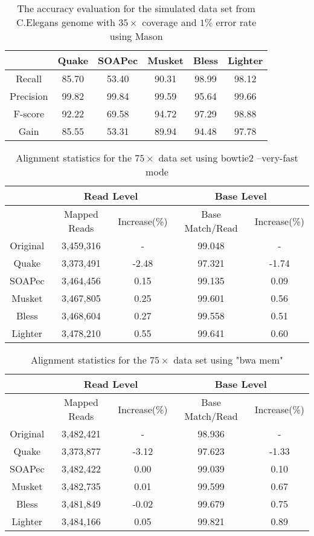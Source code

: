 \documentclass[10pt]{article}
\begin{document}
\begin{table}[h!]
\caption{The accuracy evaluation for the simulated data set from C.Elegans genome with $35\times$ coverage and $1\%$ error rate using Mason}
\begin{tabular}{|c|c|c|c|c|c|} \hline
	&Quake	&SOAPec	&Musket	&Bless	&Lighter \\ \hline
Recall	&85.70	&53.40	&90.31	&98.99	&98.12 \\ \hline
Precision	&99.82	&99.84	&99.59	&95.64	&99.66 \\ \hline
F-score	&92.22	&69.58	&94.72	&97.29	&98.88 \\ \hline
Gain	&85.55	&53.31	&89.94	&94.48	&97.78 \\ \hline
\end{tabular}
\end{table}


\begin{table}[h!] 
\caption{Alignment statistics for the $75\times$ \ecoli data set using bowtie2 --very-fast mode}
\begin{tabular}{|c|c|c||c|c|} \hline
	 & \multicolumn{2}{|c||}{Read Level} & \multicolumn{2}{|c|}{Base Level} \\ \hline
     & Mapped Reads & Increase(\%) & Base Match/Read & Increase(\%) \\ \hline
Original&	3,459,316&	-&	99.048&	-  \\ \hline 
Quake&	3,373,491&	-2.48&	97.321&	-1.74  \\ \hline
SOAPec&	3,464,456&	0.15&	99.135&	0.09  \\ \hline
Musket&	3,467,805&	0.25&	99.601&	0.56  \\ \hline
Bless&	3,468,604&	0.27&	99.558&	0.51	 \\ \hline
Lighter&	3,478,210&	0.55&	99.641&	0.60  \\ \hline
\end{tabular}
\end{table}

\begin{table}[h!] 
\caption{Alignment statistics for the $75\times$ \ecoli data set using "bwa mem"}
\begin{tabular}{|c|c|c||c|c|} \hline
	 & \multicolumn{2}{|c||}{Read Level} & \multicolumn{2}{|c|}{Base Level} \\ \hline
     & Mapped Reads & Increase(\%) & Base Match/Read & Increase(\%) \\ \hline
Original&	3,482,421&	-&	98.936&	- \\ \hline
Quake&	3,373,877&	-3.12&	97.623&	-1.33 \\ \hline
SOAPec&	3,482,422&	0.00&	99.039&	0.10 \\ \hline
Musket&	3,482,735&	0.01&	99.599&	0.67 \\ \hline
Bless&	3,481,849&	-0.02&	99.679&	0.75 \\ \hline
Lighter&	3,484,166&	0.05&	99.821&	0.89  \\ \hline
\end{tabular}
\end{table}
\end{document}
